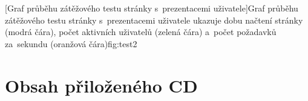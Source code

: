 \documentclass[11pt,twoside,a4paper]{book}
\begin{document}
%
[Graf průběhu zátěžového testu stránky s~prezentacemi uživatele]{Graf průběhu zátěžového testu stránky s~prezentacemi uživatele ukazuje dobu načtení stránky (modrá čára), počet aktivních uživatelů (zelená čára) a~počet požadavků za~sekundu (oranžová čára)}{fig:test2}
	

\chapter{Obsah přiloženého CD}

\end{document}
